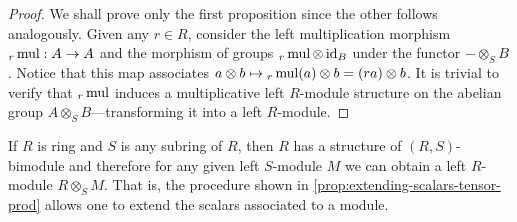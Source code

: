 \begin{proof}
We shall prove only the first proposition since the other follows
analogously. Given any \(r \in R\), consider the left multiplication morphism
\({}_r\operatorname{mul}: A \to A\) and the morphism of groups \({}_r\operatorname{mul} \otimes \operatorname{id}_B\)
under the functor \(- \otimes_S B\). Notice that this map associates
\(a \otimes b \mapsto {}_r\operatorname{mul}(a) \otimes b = (r a) \otimes b\). It is trivial
to verify that \({}_r\operatorname{mul}\) induces a multiplicative left \(R\)-module
structure on the abelian group \(A \otimes_S B\)---transforming it into a left
\(R\)-module.
\end{proof}

\begin{example}
\label{exp:extending-scalars-tensor-product}
If \(R\) is ring and \(S\) is any subring of \(R\), then \(R\) has a structure
of \((R, S)\)-bimodule and therefore for any given left \(S\)-module \(M\) we
can obtain a left \(R\)-module \(R \otimes_S M\). That is, the procedure shown
in \cref{prop:extending-scalars-tensor-prod} allows one to extend the scalars
associated to a module.
\end{example}



